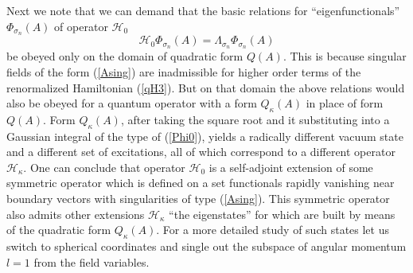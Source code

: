 \documentclass[12pt]{article}
\newcommand{\HH}{\mathscr{H}}
\begin{document}
	Next we note that we can demand that the basic relations for ``eigenfunctionals''
$ \Phi_{\sigma_{n}}(A) $
	of operator
$ \HH_{0} $
\begin{equation*}
    \HH_{0} \Phi_{\sigma_{n}}(A) = \Lambda_{\sigma_{n}} \Phi_{\sigma_{n}}(A)
\end{equation*}
	be obeyed only on the domain of quadratic form
$ Q(A) $.
	This is because singular fields of the form
(\ref{Asing})
	are inadmissible for higher order terms of the renormalized Hamiltonian
(\ref{qH3}).
	But on that domain the above relations would also be obeyed
	for a quantum operator with a form
$ Q_{\kappa}(A) $
	in place of form
$ Q(A) $.
	Form
$ Q_{\kappa}(A) $,
	after taking the square root and it substituting into a Gaussian integral
	of the type of 
(\ref{Phi0}),
	yields a radically different vacuum state and a different set of excitations,
	all of which correspond to a different operator
$ \HH_{\kappa} $.
	One can conclude that operator
$ \HH_{0} $
	is a self-adjoint extension of some symmetric operator
	which is defined on a set functionals rapidly vanishing near
	boundary vectors with singularities of type
(\ref{Asing}).
	This symmetric operator also admits other extensions 
$ \HH_{\kappa} $
	``the eigenstates'' for which are built by means of the quadratic form
$ Q_{\kappa}(A) $.
	For a more detailed study of such states let us switch to spherical coordinates
	and single out the subspace of angular momentum
$ l=1 $
	from the field variables.



\end{document}
